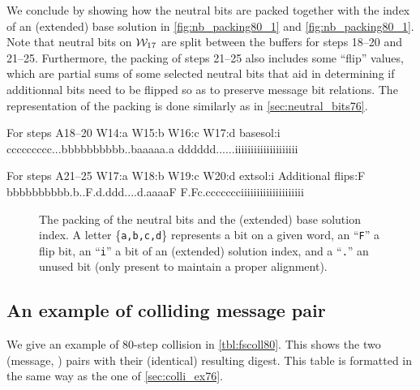 We conclude by showing how the neutral bits are packed together with the index of an (extended) base solution in \autoref{fig:nb_packing80_1} and \autoref{fig:nb_packing80_1}.
Note that neutral bits on $\mathcal{W}_{17}$ are split between the buffers for steps 18--20 and 21--25. Furthermore, the packing of steps 21--25 also includes
some ``flip'' values, which are partial sums of some selected neutral bits that aid in determining if additionnal bits need to be flipped so as to preserve message bit relations.
The representation of the packing is done similarly as in \autoref{sec:neutral_bits76}.

\begin{verbbox}[\vspace{1mm}]
For steps A18--20
W14:a W15:b W16:c W17:d basesol:i
ccccccccc...bbbbbbbbbb..baaaaa.a
dddddd......iiiiiiiiiiiiiiiiiiii

For steps A21--25
W17:a W18:b W19:c W20:d extsol:i
Additional flips:F
bbbbbbbbbb.b..F.d.ddd....d.aaaaF
F.Fc.ccccccciiiiiiiiiiiiiiiiiiii
\end{verbbox}

\begin{figure}[ht]
\centering
  \theverbbox
  \caption{The packing of the neutral bits and the (extended) base solution index.
  A letter \{\texttt{a,b,c,d}\} represents a bit on a given word, an ``\texttt{F}'' a flip bit, an ``\texttt{i}'' a bit
  of an (extended) solution index, and  a ``\texttt{.}'' an unused bit (only present to maintain a proper alignment).
  \label{fig:nb_packing80_1}}
\end{figure}



\subsection{An example of colliding message pair}
\label{sec:colli_ex80}

We give an example of 80-step collision in \autoref{tbl:fscoll80}.
This shows the two (message, \iv) pairs with their (identical) resulting digest.
This table is formatted in the same way as the one of \autoref{sec:colli_ex76}.

